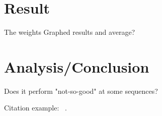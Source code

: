 \documentclass[twocolumn,12pt,journal]{IEEEtran}
\begin{document}
\section{Result} %
    The weights
    Graphed results and average?

\section{Analysis/Conclusion} %
    Does it perform "not-so-good" at some sequences?


    Citation example: ~\cite{BillionKeys}.


\begingroup
  \raggedright
  
  
\endgroup
\end{document}

